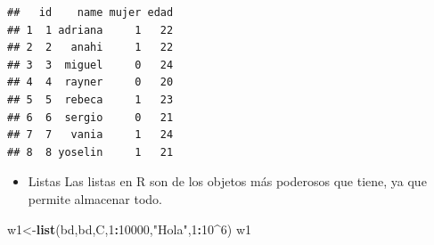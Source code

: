 \documentclass[
]{book}
\newenvironment{Shaded}{\begin{snugshade}}{\end{snugshade}}
\newcommand{\CommentTok}[1]{\textcolor[rgb]{0.56,0.35,0.01}{\textit{#1}}}
\newcommand{\DecValTok}[1]{\textcolor[rgb]{0.00,0.00,0.81}{#1}}
\newcommand{\KeywordTok}[1]{\textcolor[rgb]{0.13,0.29,0.53}{\textbf{#1}}}
\newcommand{\NormalTok}[1]{#1}
\newcommand{\OperatorTok}[1]{\textcolor[rgb]{0.81,0.36,0.00}{\textbf{#1}}}
\newcommand{\StringTok}[1]{\textcolor[rgb]{0.31,0.60,0.02}{#1}}
\providecommand{\tightlist}{%
  \setlength{\itemsep}{0pt}\setlength{\parskip}{0pt}}
\begin{document}
\begin{Shaded}
\end{Shaded}

\begin{verbatim}
##   id    name mujer edad
## 1  1 adriana     1   22
## 2  2   anahi     1   22
## 3  3  miguel     0   24
## 4  4  rayner     0   20
## 5  5  rebeca     1   23
## 6  6  sergio     0   21
## 7  7   vania     1   24
## 8  8 yoselin     1   21
\end{verbatim}

\begin{itemize}
\tightlist
\item
  Listas
  Las listas en R son de los objetos más poderosos que tiene, ya que permite almacenar todo.
\end{itemize}

\begin{Shaded}
\begin{Highlighting}[]
\NormalTok{w1<-}\KeywordTok{list}\NormalTok{(bd,bd,C,}\DecValTok{1}\OperatorTok{:}\DecValTok{10000}\NormalTok{,}\StringTok{"Hola"}\NormalTok{,}\DecValTok{1}\OperatorTok{:}\DecValTok{10}\OperatorTok{^}\DecValTok{6}\NormalTok{)}
\NormalTok{w1}
\end{Highlighting}
\end{Shaded}
\end{document}
